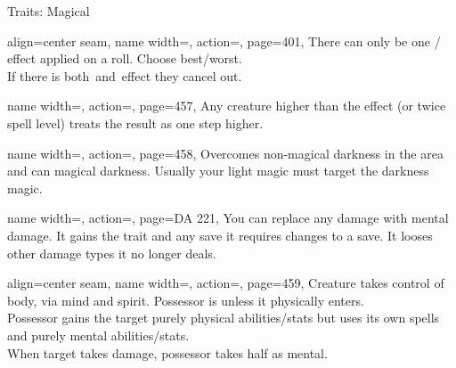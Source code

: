 \begin{PageFront}
\begin{Tables}{\frontTableHeight}
\begin{Table}{Traits: Magical}
            \begin{entry}{}{%
                align=center seam,
                name width=\conditionLength,%
                action=\stackbox[l][c]{\Fortune\\\vspace{-0.6ex}\Misfortune},
                page=401,
            }
                There can only be one \Fortune/\Misfortune\,effect applied on a roll.
                Choose best/worst.\\
                If there is both \Fortune\,and \Misfortune\,effect they cancel out.
            \end{entry}
            \begin{entry}{}{%
                name width=\conditionLength,%
                action=\Incapacitation,
                page=457,
            }
                Any creature higher than the effect {(or twice spell level)} treats the result as one step
                higher.
            \end{entry}
            \begin{entry}{}{%
                name width=\conditionLength,%
                action=\Light,
                page=458,
            }
                Overcomes non-magical darkness in the area and can  magical darkness.
                Usually your light magic must target the darkness magic.
            \end{entry}
            \begin{entry}{}{%
                name width=\conditionLength,%
                action=\Mindshift,
                page=DA 221,
            }
                You can replace any damage with mental damage. It gains the \Mental trait and any save it
                requires changes to a \WillT save. It looses other damage types it no longer deals.
            \end{entry}
            \begin{entry}{}{%
                align=center seam,
                name width=\conditionLength,%
                action=\Possession,
                page=459,
            }
                Creature takes control of body, via mind and spirit. Possessor is \Unconscious unless it
                physically enters.\\
                Possessor gains the target purely physical abilities/stats but uses its own spells and purely mental
                abilities/stats.\\
                When target takes damage, possessor takes half as mental. \hfill {}
\end{entry}
\end{Table}
\end{Tables}
\end{PageFront}

